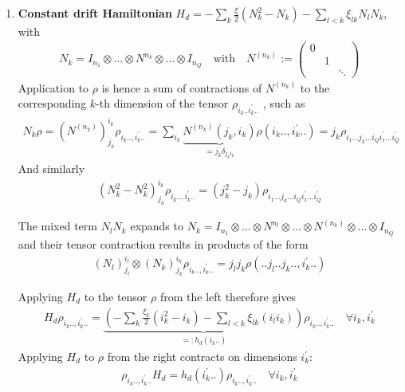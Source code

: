 \documentclass[letterpaper]{article}
\begin{document}
\begin{enumerate}
    \item \textbf{Constant drift Hamiltonian} $H_d = -\sum_k \frac{\xi}{2} \left(N_k^2 - N_k\right) - \sum_{l<k} \xi_{lk} N_lN_k$, with
      \begin{align}
      N_k = I_{n_1}\otimes \dots \otimes N^{n_k} \otimes \dots \otimes I_{n_Q} \quad \text{with} \quad N^{(n_k)} := \begin{pmatrix} 0 & & \\ & 1& \\ & & \ddots \end{pmatrix}
      \end{align}
      Application to $\rho$ is hence a sum of contractions of $N^{(n_k)}$ to the corresponding $k$-th dimension of the tensor $\rho_{i_k..i_k^\prime..}$ , such as
      \begin{align}
        N_k \rho = \left(N^{(n_k)}\right)_{j_k}^{i_k} \rho_{i_k .., i_k^\prime ..} = \sum_{i_k} \underbrace{N^{(n_k)}(j_k, i_k)}_{ = j_k\delta_{j_ki_k} } \rho(i_k.., i_k^\prime ..) = j_k \rho_{i_1\dots j_k \dots i_Q i_1^\prime \dots i_Q^\prime}
      \end{align}
      And similarly
      \begin{align}
        \left(N_k^2-N_k^2\right)_{j_k}^{i_k} \rho_{i_k .., i_k^\prime ..} = \left(j_k^2 - j_k\right) \rho_{i_1\dots j_k \dots i_Q i_1^\prime \dots i_Q^\prime}
      \end{align}

      The mixed term $N_lN_k$ expands to $N_k = I_{n_1}\otimes \dots \otimes N^{n_l} \otimes \dots \otimes N^{(n_k)} \otimes \dots \otimes I_{n_Q}$ and their tensor contraction results in products of the form 
      \begin{align}
        (N_l)^{i_l}_{j_l} \otimes (N_k)_{j_k}^{i_k} \rho_{i_k .., i_k^\prime ..} = j_lj_k\rho(..j_l .. j_k.., i_k^\prime ..)
      \end{align}

      Applying $H_d$ to the tensor $\rho$ from the left therefore gives  
      \begin{align}
        H_d \rho_{i_k .., i_k^\prime ..} = \underbrace{\left(-\sum_k \frac{\xi_k}{2}(i_k^2 - i_k) - \sum_{l<k} \xi_{lk} (i_l i_k) \right)}_{=:h_d(i_k..)} \rho_{i_k .., i_k^\prime..} \quad \forall i_k, i_k^\prime
      \end{align}
      Applying $H_d$ to $\rho$ from the right contracts on dimensions $i_k^\prime$:
      \begin{align}
        \rho_{i_k .., i_k^\prime ..} H_d  = h_d(i_k^\prime..) \rho_{i_k .., i_k^\prime..} \quad \forall i_k, i_k^\prime
        \end{align}


\end{enumerate}
\end{document}
